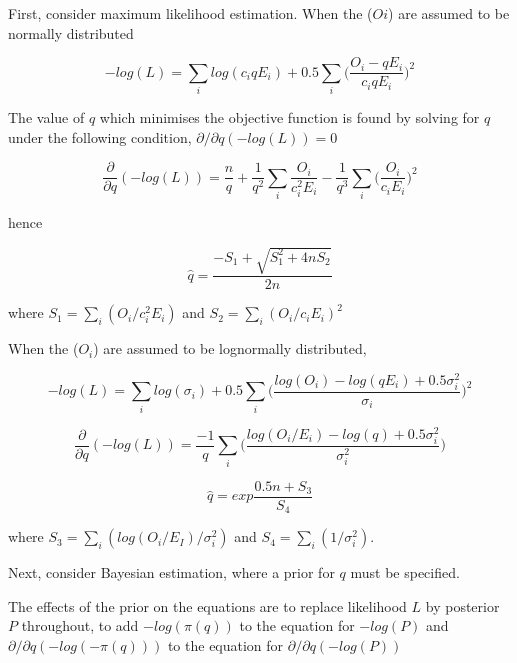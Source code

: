First, consider maximum likelihood estimation. When the ($Oi$) are assumed to be normally distributed

\begin{equation}\label{EQ:1}
-log(L) = \sum_i log (c_iqE_i) + 0.5\sum_i \bigg(\frac{O_i - qE_i}{c_iqE_i} \bigg)^2
\end{equation}

The value of $q$ which minimises the objective function is found by solving for $q$ under the following condition, $\partial/\partial q(-log(L)) = 0$

\begin{equation}\label{EQ:2}
\frac{\partial }{\partial q}(-log(L)) = \frac{n}{q} + \frac{1}{q^2} \sum_i \frac{O_i}{c_i^2E_i} - \frac{1}{q^3} \sum_i \bigg(\frac{O_i}{c_iE_i}\bigg)^2
\end{equation}

hence

\begin{equation}\label{EQ:3}
\hat q = \frac{-S_1 + \sqrt{S_1^2 + 4nS_2}}{2n}
\end{equation}

where $S_1 = \sum_i (O_i/c_i^2E_i)$ and $S_2 = \sum_i (O_i/c_iE_i)^2$

When the ($O_i$) are assumed to be lognormally distributed,

\begin{equation}\label{EQ:4}
-log(L) = \sum_i log (\sigma_i) + 0.5\sum_i \bigg(\frac{log(O_i) - log(qE_i) + 0.5\sigma_i^2}{\sigma_i} \bigg)^2
\end{equation}

\begin{equation}\label{EQ:5}
\frac{\partial }{\partial q}(-log(L)) = \frac{-1}{q} \sum_i\bigg( \frac{log(O_i/E_i) - log(q) + 0.5\sigma_i^2}{\sigma_i^2}\bigg)
\end{equation}

\begin{equation}\label{EQ:6}
\hat q = exp\frac{0.5n + S_3}{S_4}
\end{equation}

where $S_3 = \sum_i (log(O_i /E_I)/\sigma_i^2)$ and $S_4 = \sum_i(1/\sigma_i^2)$.

Next, consider Bayesian estimation, where a prior for $q$ must be specified.

The effects of the prior on the equations are to replace likelihood $L$ by posterior $P$ throughout, to add $-log(\pi(q))$ to the equation for $-log(P)$ and $\partial/\partial q(-log(-\pi(q)))$ to the equation for $\partial/\partial q(-log(P))$

